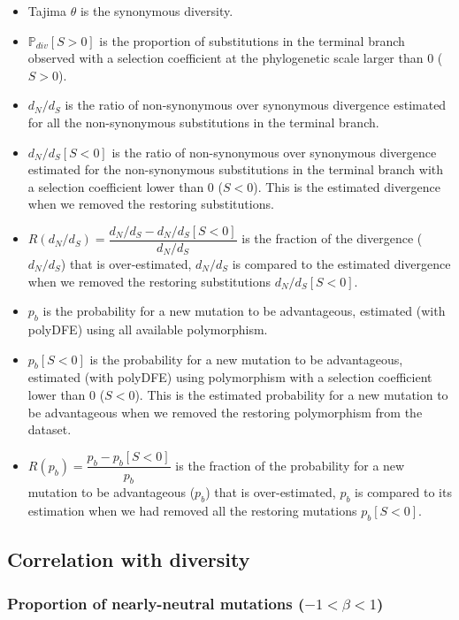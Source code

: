 \documentclass{article}
\newcommand{\dn}{d_N}
\newcommand{\ds}{d_S}
\newcommand{\dnds}{\dn / \ds}
\newcommand{\Sphy}{S}
\newcommand{\Spop}{\beta}
\newcommand{\polyNeutral}{-1 < \Spop < 1}
\begin{document}
    \begin{itemize}
        \item Tajima $\theta$ is the synonymous diversity.
        \item $\mathbb{P}_{div}[\Sphy > 0]$ is the proportion of substitutions in the terminal branch observed with a selection coefficient at the phylogenetic scale larger than 0 ($\Sphy > 0$).
        \item $\dnds$ is the ratio of non-synonymous over synonymous divergence estimated for all the non-synonymous substitutions in the terminal branch.
        \item $\dnds[\Sphy < 0]$ is the ratio of non-synonymous over synonymous divergence estimated for the non-synonymous substitutions in the terminal branch with a selection coefficient lower than 0 ($\Sphy < 0$).
        This is the estimated divergence when we removed the restoring substitutions.
        \item $R(\dnds)=\dfrac{\dnds - \dnds[\Sphy < 0]}{\dnds}$ is the fraction of the divergence ($\dnds$) that is over-estimated, $\dnds$ is compared to the estimated divergence when we removed the restoring substitutions $\dnds[\Sphy < 0]$.
        \item $p_b$ is the probability for a new mutation to be advantageous, estimated (with polyDFE) using all available polymorphism.
        \item $p_b[\Sphy < 0]$ is the probability for a new mutation to be advantageous, estimated (with polyDFE) using polymorphism with a selection coefficient lower than 0 ($\Sphy < 0$).
        This is the estimated probability for a new mutation to be advantageous when we removed the restoring polymorphism from the dataset.
        \item $R(p_b)=\dfrac{p_b - p_b[\Sphy < 0]}{p_b}$ is the fraction of the probability for a new mutation to be advantageous ($p_b$) that is over-estimated, $p_b$ is compared to its estimation when we had removed all the restoring mutations $p_b[\Sphy < 0]$.
    \end{itemize}

    \subsection{Correlation with diversity}

    \subsubsection{Proportion of nearly-neutral mutations ($\polyNeutral$)}
\end{document}
